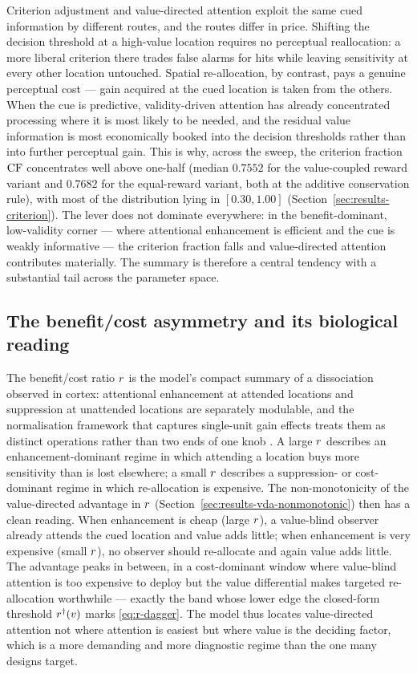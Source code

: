 Criterion adjustment and value-directed attention exploit the same cued
information by different routes, and the routes differ in price. Shifting
the decision threshold at a high-value location requires no perceptual
reallocation: a more liberal criterion there trades false alarms for
hits while leaving sensitivity at every other location untouched. Spatial
re-allocation, by contrast, pays a genuine perceptual cost --- gain
acquired at the cued location is taken from the others. When the cue is
predictive, validity-driven attention has already concentrated processing
where it is most likely to be needed, and the residual value information
is most economically booked into the decision thresholds rather than into
further perceptual gain. This is why, across the sweep, the criterion
fraction $\mathrm{CF}$ concentrates well above one-half (median $0.7552$ for the
value-coupled reward variant and $0.7682$ for the equal-reward
variant, both at the additive conservation rule), with most of the
distribution lying in $[0.30, 1.00]$
(Section~\ref{sec:results-criterion}). The lever does not dominate
everywhere: in the benefit-dominant, low-validity corner --- where
attentional enhancement is efficient and the cue is weakly informative
--- the criterion fraction falls and value-directed attention contributes
materially. The summary is therefore a central tendency with a
substantial tail across the parameter space.

\subsection*{The benefit/cost asymmetry and its biological reading}

The benefit/cost ratio $r$ is the model's compact summary of a
dissociation observed in cortex: attentional enhancement at attended
locations and suppression at unattended locations are separately
modulable, and the normalisation framework that captures single-unit
gain effects treats them as distinct operations rather than two ends of
one knob
\cite{reynolds_heeger2009_normalization, mcadams_maunsell1999_v4_tuning,
treue_martinez_trujillo1999_feature_attention, carrasco2011_visual_attention_25y}.
A large $r$ describes an enhancement-dominant regime in which
attending a location buys more sensitivity than is lost elsewhere; a
small $r$ describes a suppression- or cost-dominant regime in which
re-allocation is expensive. The non-monotonicity of the value-directed
advantage in $r$ (Section~\ref{sec:results-vda-nonmonotonic}) then
has a clean reading. When enhancement is cheap (large $r$), a
value-blind observer already attends the cued location and value adds
little; when enhancement is very expensive (small $r$), no observer
should re-allocate and again value adds little. The advantage peaks in
between, in a cost-dominant window where value-blind attention is too
expensive to deploy but the value differential makes targeted
re-allocation worthwhile --- exactly the band whose lower edge the
closed-form threshold $r^{\dagger}(v)$ marks
\eqref{eq:r-dagger}. The model thus locates value-directed attention not
where attention is easiest but where value is the deciding factor, which
is a more demanding and more diagnostic regime than the one many designs
target.

